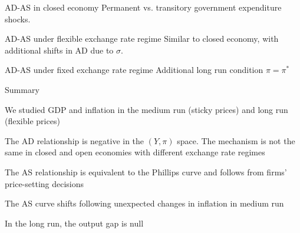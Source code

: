 \documentclass{beamer}
\newenvironment{mytemize}
{\vfill\itemize[nolistsep,itemsep=\fill,label=\color{blue}{$\triangleright$}]}
  {\enditemize}
\begin{document}
\begin{frame}{AD-AS in closed economy}
  \vspace{-5cm}
  Permanent vs. transitory government expenditure shocks.

\end{frame}
\begin{frame}{AD-AS under flexible exchange rate regime}
  \vspace{-5cm}
  Similar to closed economy, with additional shifts in AD due to $\sigma$.
\end{frame}

\begin{frame}{AD-AS under fixed exchange rate regime}
  \vspace{-5cm}
  Additional long run condition $\pi = \pi^*$
\end{frame}

\begin{frame}{Summary}
\begin{mytemize}
    \item We studied GDP and inflation in the medium run (sticky prices) and long run (flexible prices)
    \item The AD relationship is negative in the $(Y, \pi)$ space. The mechanism is not the same in closed and open economies with different exchange rate regimes
    \item The AS relationship is equivalent to the Phillips curve and follows from firms' price-setting decisions
    \item The AS curve shifts following unexpected changes in inflation in medium run
    \item In the long run, the output gap is null
\end{mytemize}

\end{frame}
\end{document}
